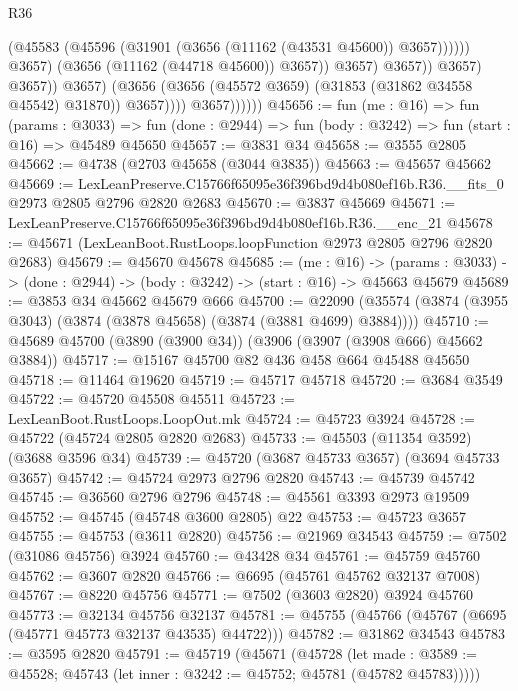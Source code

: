 \begin{lexlean}{R36}
\begin{coremodule}
                                            (@45583
                                              (@45596
                                                (@31901 (@3656 (@11162 (@43531 @45600)) @3657))))))
                                        @3657)
                                      (@3656 (@11162 (@44718 @45600)) @3657))
                                    @3657)
                                  @3657))
                              @3657)
                            @3657))
                        @3657)
                      (@3656 (@3656 (@45572 @3659) (@31853 (@31862 @34558 @45542) @31870)) @3657))))
                @3657))))))
@45656 := fun (me : @16) =>
  fun (params : @3033) =>
  fun (done : @2944) => fun (body : @3242) => fun (start : @16) => @45489 @45650
@45657 := @3831 @34
@45658 := @3555 @2805
@45662 := @4738 (@2703 @45658 (@3044 @3835))
@45663 := @45657 @45662
@45669 := LexLeanPreserve.C15766f65095e36f396bd9d4b080ef16b.R36.__fits_0
    @2973
    @2805
    @2796
    @2820
    @2683
@45670 := @3837 @45669
@45671 := LexLeanPreserve.C15766f65095e36f396bd9d4b080ef16b.R36.__enc_21
@45678 := @45671 (LexLeanBoot.RustLoops.loopFunction @2973 @2805 @2796 @2820 @2683)
@45679 := @45670 @45678
@45685 := (me : @16) ->
  (params : @3033) -> (done : @2944) -> (body : @3242) -> (start : @16) -> @45663 @45679
@45689 := @3853 @34 @45662 @45679 @666
@45700 := @22090 (@35574 (@3874 (@3955 @3043) (@3874 (@3878 @45658) (@3874 (@3881 @4699) @3884))))
@45710 := @45689 @45700 (@3890 (@3900 @34)) (@3906 (@3907 (@3908 @666) @45662 @3884))
@45717 := @15167 @45700 @82 @436 @458 @664 @45488 @45650
@45718 := @11464 @19620
@45719 := @45717 @45718
@45720 := @3684 @3549
@45722 := @45720 @45508 @45511
@45723 := LexLeanBoot.RustLoops.LoopOut.mk
@45724 := @45723 @3924
@45728 := @45722 (@45724 @2805 @2820 @2683)
@45733 := @45503 (@11354 @3592) (@3688 @3596 @34)
@45739 := @45720 (@3687 @45733 @3657) (@3694 @45733 @3657)
@45742 := @45724 @2973 @2796 @2820
@45743 := @45739 @45742
@45745 := @36560 @2796 @2796
@45748 := @45561 @3393 @2973 @19509
@45752 := @45745 (@45748 @3600 @2805) @22
@45753 := @45723 @3657
@45755 := @45753 (@3611 @2820)
@45756 := @21969 @34543
@45759 := @7502 (@31086 @45756) @3924
@45760 := @43428 @34
@45761 := @45759 @45760
@45762 := @3607 @2820
@45766 := @6695 (@45761 @45762 @32137 @7008)
@45767 := @8220 @45756
@45771 := @7502 (@3603 @2820) @3924 @45760
@45773 := @32134 @45756 @32137
@45781 := @45755 (@45766 (@45767 (@6695 (@45771 @45773 @32137 @43535) @44722)))
@45782 := @31862 @34543
@45783 := @3595 @2820
@45791 := @45719
    (@45671
      (@45728
        (let made : @3589 := @45528; @45743 (let inner : @3242 := @45752; @45781 (@45782 @45783)))))

\end{coremodule}
\end{lexlean}
